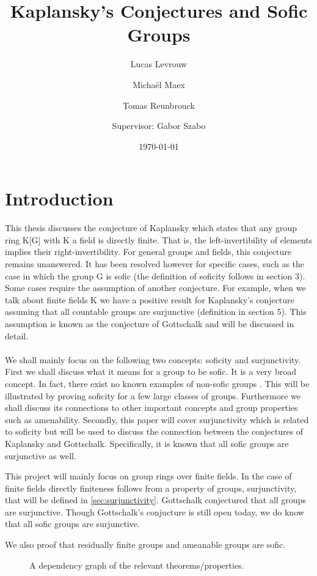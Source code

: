 \documentclass[titlepage, a4paper]{article}
\author{Lucas Levrouw \and Michaël Maex \and Tomas Reunbrouck \and Supervisor: Gabor Szabo}
\title{Kaplansky's Conjectures and Sofic Groups}
\date{\today}
\theoremstyle{remark}
\begin{document}
    \maketitle
{}
\tableofcontents
\pagebreak

\section{Introduction}\label{sec:intro}
This thesis discusses the conjecture of Kaplansky which states that any group ring K[G] with K a field is directly finite. That is, the left-invertibility of elements implies their right-invertibility. For general groups and fields, this conjecture remains unanswered. It has been resolved however for specific cases, such as the case in which the group G is sofic (the definition of soficity follows in section 3). Some cases require the assumption of another conjecture. For example, when we talk about finite fields K we have a positive result for Kaplansky’s conjecture assuming that all countable groups are surjunctive (definition in section 5). This assumption is known as the conjecture of Gottschalk and will be discussed in detail.\\
\\
We shall mainly focus on the following two concepts: soficity and surjunctivity. First we shall discuss what it means for a group to be sofic. It is a very broad concept. In fact, there exist no known examples of non-sofic groups \cite{weiss_2000}. This will be illustrated by proving soficity for a few large classes of groups. Furthermore we shall discuss its connections to other important concepts and group properties such as amenability. Secondly, this paper will cover surjunctivity which is related to soficity but will be used to discuss the connection between the conjectures of Kaplansky and Gottschalk. Specifically, it is known that all sofic groups are surjunctive as well.

This project will mainly focus on group rings over finite fields. 
In the case of finite fields directly finiteness follows from a property of groups, surjunctivity, that will be defined in \cref{sec:surjunctivity}.
Gottschalk conjectured that all groups are surjunctive. 
Though Gottschalk's conjucture is still open today, we do know that all sofic groups are surjunctive.

We also proof that residually finite groups and ameanable groups are sofic. 
\begin{figure}[h]
	\centering
{}
\caption{A dependency graph of the relevant theorems/properties. }
\end{figure}
\end{document}
